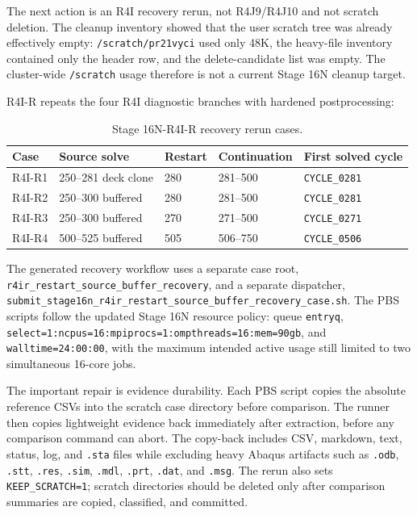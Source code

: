 \documentclass[11pt,a4paper]{article}
\newcommand{\code}[1]{\texttt{#1}}
\begin{document}
The next action is an R4I recovery rerun, not R4J9/R4J10 and not scratch deletion. The cleanup inventory showed that the user scratch tree was already effectively empty: \code{/scratch/pr21vyci} used only 48K, the heavy-file inventory contained only the header row, and the delete-candidate list was empty. The cluster-wide \code{/scratch} usage therefore is not a current Stage 16N cleanup target.

R4I-R repeats the four R4I diagnostic branches with hardened postprocessing:

\begin{table}[H]
\centering
\caption{Stage 16N-R4I-R recovery rerun cases.}
\begin{tabular}{lllll}
\toprule
Case & Source solve & Restart & Continuation & First solved cycle \\
\midrule
R4I-R1 & 250--281 deck clone & 280 & 281--500 & \code{CYCLE\_0281} \\
R4I-R2 & 250--300 buffered & 280 & 281--500 & \code{CYCLE\_0281} \\
R4I-R3 & 250--300 buffered & 270 & 271--500 & \code{CYCLE\_0271} \\
R4I-R4 & 500--525 buffered & 505 & 506--750 & \code{CYCLE\_0506} \\
\bottomrule
\end{tabular}
\end{table}

The generated recovery workflow uses a separate case root, \code{r4ir\_restart\_source\_buffer\_recovery}, and a separate dispatcher, \code{submit\_stage16n\_r4ir\_restart\_source\_buffer\_recovery\_case.sh}. The PBS scripts follow the updated Stage 16N resource policy: queue \code{entryq}, \code{select=1:ncpus=16:mpiprocs=1:ompthreads=16:mem=90gb}, and \code{walltime=24:00:00}, with the maximum intended active usage still limited to two simultaneous 16-core jobs.

The important repair is evidence durability. Each PBS script copies the absolute reference CSVs into the scratch case directory before comparison. The runner then copies lightweight evidence back immediately after extraction, before any comparison command can abort. The copy-back includes CSV, markdown, text, status, log, and \code{.sta} files while excluding heavy Abaqus artifacts such as \code{.odb}, \code{.stt}, \code{.res}, \code{.sim}, \code{.mdl}, \code{.prt}, \code{.dat}, and \code{.msg}. The rerun also sets \code{KEEP\_SCRATCH=1}; scratch directories should be deleted only after comparison summaries are copied, classified, and committed.
\end{document}
